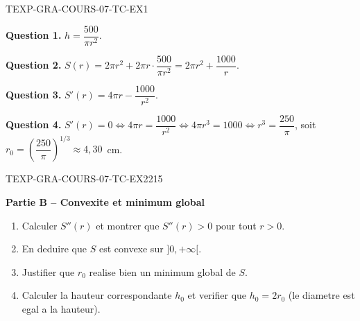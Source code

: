 \begin{corrige}{TEXP-GRA-COURS-07-TC-EX1}

\textbf{Question 1.} $h = \dfrac{500}{\pi r^2}$.

\textbf{Question 2.} $S(r) = 2\pi r^2 + 2\pi r \cdot \dfrac{500}{\pi r^2} = 2\pi r^2 + \dfrac{1000}{r}$.


\textbf{Question 3.} $S'(r) = 4\pi r - \dfrac{1000}{r^2}$.

\textbf{Question 4.} $S'(r) = 0 \iff 4\pi r = \dfrac{1000}{r^2} \iff 4\pi r^3 = 1000 \iff r^3 = \dfrac{250}{\pi}$, soit $r_0 = \left(\dfrac{250}{\pi}\right)^{1/3} \approx 4{,}30$~cm.

\end{corrige}

\bigskip


\begin{exercice}{TEXP-GRA-COURS-07-TC-EX2}{2}{15}

\textbf{Partie B -- Convexite et minimum global}

\begin{enumerate}
  \item Calculer $S''(r)$ et montrer que $S''(r) > 0$ pour tout $r > 0$.
  \item En deduire que $S$ est convexe sur $]0, +\infty[$.
  \item Justifier que $r_0$ realise bien un minimum global de $S$.
  \item Calculer la hauteur correspondante $h_0$ et verifier que $h_0 = 2r_0$ (le diametre est egal a la hauteur).
\end{enumerate}

\end{exercice}

